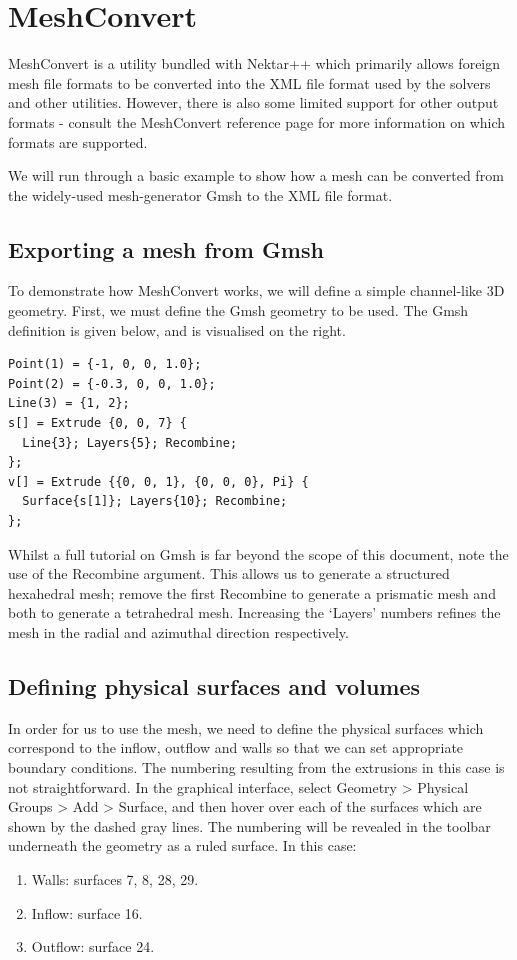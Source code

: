 \section{MeshConvert}
\label{s:utilities:meshconvert}

MeshConvert is a utility bundled with Nektar++ which primarily allows foreign
mesh file formats to be converted into the XML file format used by the solvers
and other utilities. However, there is also some limited support for other
output formats - consult the MeshConvert reference page for more information on
which formats are supported.

We will run through a basic example to show how a mesh can be
converted from the widely-used mesh-generator Gmsh to the XML file format.


\subsection{Exporting a mesh from Gmsh}

To demonstrate how MeshConvert works, we will define a simple channel-like 3D
geometry.
First, we must define the Gmsh geometry to be used. The Gmsh definition is given
below, and is visualised on the right.

\begin{lstlisting}[style=XmlStyle]
Point(1) = {-1, 0, 0, 1.0};
Point(2) = {-0.3, 0, 0, 1.0};
Line(3) = {1, 2};
s[] = Extrude {0, 0, 7} {
  Line{3}; Layers{5}; Recombine;
};
v[] = Extrude {{0, 0, 1}, {0, 0, 0}, Pi} {
  Surface{s[1]}; Layers{10}; Recombine;
};
\end{lstlisting}

Whilst a full tutorial on Gmsh is far beyond the scope of this document, note
the use of the Recombine argument. This allows us to generate a structured
hexahedral mesh; remove the first Recombine to generate a prismatic mesh and
both to generate a tetrahedral mesh. Increasing the `Layers' numbers refines the
mesh in the radial and azimuthal direction respectively.

\subsection{Defining physical surfaces and volumes}

In order for us to use the mesh, we need to define the physical surfaces which correspond to the inflow, outflow and walls so that we can set appropriate boundary conditions. The numbering resulting from the extrusions in this case is not straightforward. In the graphical interface, select Geometry > Physical Groups > Add > Surface, and then hover over each of the surfaces which are shown by the dashed gray lines. The numbering will be revealed in the toolbar underneath the geometry as a ruled surface. In this case:
\begin{enumerate}
\item Walls: surfaces 7, 8, 28, 29.
\item Inflow: surface 16.
\item Outflow: surface 24.
\end{enumerate}

